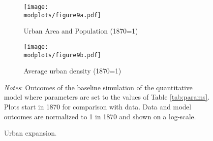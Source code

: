 \documentclass[./20250130-paper.tex]{subfiles}
\begin{document}
		
		

\begin{figure}[hpt]
	\begin{adjustbox}{center}	
		\begin{subfigure}{\ptwo\textwidth}
			\texttt{[image: \\modplots/figure9a.pdf]}
			\caption{Urban Area and Population (1870=1)\label{fig:model-citysize}}
		\end{subfigure}
		\hspace{0.1cm}
		\begin{subfigure}{\ptwo\textwidth}
			\texttt{[image: \\modplots/figure9b.pdf]}
			\caption{Average urban density (1870=1)\label{fig:model-density}}
		\end{subfigure}	
	\end{adjustbox}	
	\caption{Urban expansion.\label{fig:model-urbanexp}}
	{\footnotesize \textit{Notes}: Outcomes of the baseline simulation of the quantitative model where parameters are set to the values of Table \ref{tab:params}. Plots start in 1870 for comparison with data. Data and model outcomes are normalized to 1 in 1870 and shown on a log-scale.}	
\end{figure}
\end{document}
